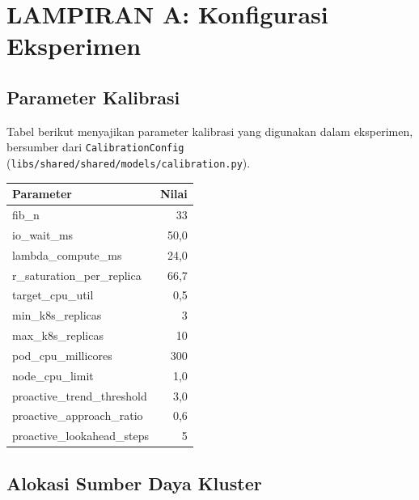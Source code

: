 
\chapter*{LAMPIRAN A: Konfigurasi Eksperimen}

\section*{Parameter Kalibrasi}

Tabel berikut menyajikan parameter kalibrasi yang digunakan dalam eksperimen, bersumber dari \texttt{CalibrationConfig} (\texttt{libs/shared/shared/models/calibration.py}).

\begin{table}[htbp]
    \centering
    \begin{tabular}{lr}
        \toprule
        Parameter & Nilai \\
        \midrule
        fib\_n & 33 \\
        io\_wait\_ms & 50,0 \\
        lambda\_compute\_ms & 24,0 \\
        r\_saturation\_per\_replica & 66,7 \\
        target\_cpu\_util & 0,5 \\
        min\_k8s\_replicas & 3 \\
        max\_k8s\_replicas & 10 \\
        pod\_cpu\_millicores & 300 \\
        node\_cpu\_limit & 1,0 \\
        proactive\_trend\_threshold & 3,0 \\
        proactive\_approach\_ratio & 0,6 \\
        proactive\_lookahead\_steps & 5 \\
        \bottomrule
    \end{tabular}
\end{table}

\section*{Alokasi Sumber Daya Kluster}

